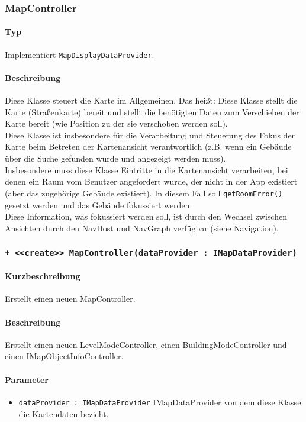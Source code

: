 \subsubsection{MapController}\label{App_Map_ViewModel_MapController}
\paragraph*{Typ}
Implementiert \texttt{MapDisplayDataProvider}.
\paragraph*{Beschreibung}
Diese Klasse steuert die Karte im Allgemeinen. Das heißt: Diese Klasse stellt die Karte (Straßenkarte) bereit 
und stellt die benötigten Daten zum Verschieben der Karte bereit (wie Position zu der sie verschoben werden soll).\\
Diese Klasse ist insbesondere für die Verarbeitung und Steuerung des Fokus der Karte beim Betreten der 
Kartenansicht verantwortlich (z.B. wenn ein Gebäude über die Suche gefunden wurde und angezeigt werden muss).\\
Insbesondere muss diese Klasse Eintritte in die Kartenansicht verarbeiten, bei denen ein Raum vom Benutzer angefordert wurde, 
der nicht in der App existiert (aber das zugehörige Gebäude existiert). In diesem Fall soll \texttt{getRoomError()} gesetzt 
werden und das Gebäude fokussiert werden.\\
Diese Information, was fokussiert werden soll, ist durch den Wechsel zwischen Ansichten durch den NavHost und NavGraph verfügbar (siehe Navigation).

\subsubsection*{\texttt{+ <<create>> MapController(dataProvider : IMapDataProvider)}}\label{App_Map_ViewModel_createMapController}%
\paragraph*{Kurzbeschreibung}
Erstellt einen neuen MapController.
\paragraph*{Beschreibung}
Erstellt einen neuen LevelModeController, einen BuildingModeController und einen IMapObjectInfoController.
\paragraph*{Parameter}
\begin{itemize}
    \item \texttt{dataProvider : IMapDataProvider} IMapDataProvider von dem diese Klasse die Kartendaten bezieht.
\end{itemize}
